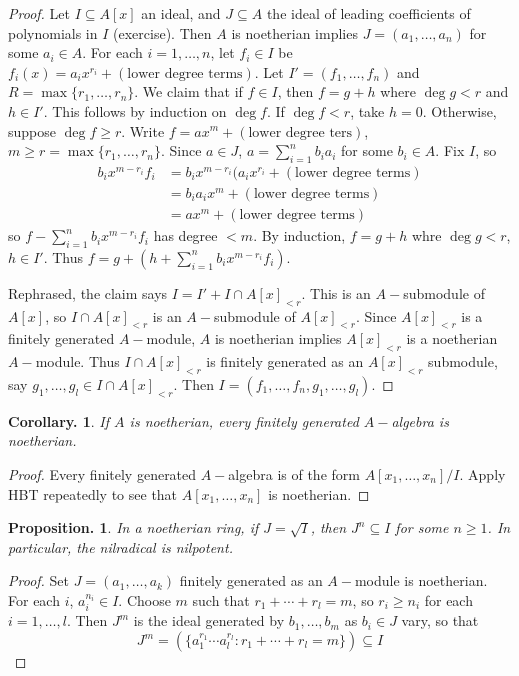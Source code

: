 \documentclass[11pt, a4paper]{memoir}
\theoremstyle{change}
\newtheorem{corollary}[theorem]{Corollary.}
\newtheorem{proposition}[theorem]{Proposition.}
\theoremstyle{plain}
\theoremstyle{nonumberplain}
\newtheorem{proof}{Proof}
\numberwithin{equation}{section}
\begin{document}
\begin{proof}
    Let $I\subseteq A[x]$ an ideal, and $J\subseteq A$ the ideal of leading coefficients of polynomials in $I$ (exercise).
    Then $A$ is noetherian implies $J=(a_1,\ldots,a_n)$ for some $a_i\in A$.
    For each $i=1,\ldots,n$, let $f_i\in I$ be $f_i(x)=a_ix^{r_i}+(\text{lower degree terms})$.
    Let $I'=(f_1,\ldots,f_n)$ and $R=\max\{r_1,\ldots,r_n\}$.
    We claim that if $f\in I$, then $f=g+h$ where $\deg g<r$ and $h\in I'$.
    This follows by induction on $\deg f$.
    If $\deg f<r$, take $h=0$.
    Otherwise, suppose $\deg f\geq r$.
    Write $f=ax^m+(\text{lower degree ters})$, $m\geq r=\max\{r_1,\ldots,r_n\}$.
    Since $a\in J$, $a=\sum_{i=1}^n b_ia_i$ for some $b_i\in A$.
    Fix $I$, so
    \begin{align*}
        b_ix^{m-r_i}f_i &= b_ix^{m-r_i}(a_ix^{r_i}+(\text{lower degree terms})\\
                        &= b_ia_ix^m+(\text{lower degree terms})\\
                        &= ax^m+(\text{lower degree terms})
    \end{align*}
    so $f-\sum_{i=1}^n b_ix^{m-r_i}f_i$ has degree $<m$.
    By induction, $f=g+h$ whre $\deg g<r$, $h\in I'$.
    Thus $f=g+(h+\sum_{i=1}^n b_ix^{m-r_i}f_i)$.

    Rephrased, the claim says $I=I'+I\cap A[x]_{<r}$.
    This is an $A-$submodule of $A[x]$, so $I\cap A[x]_{<r}$ is an $A-$submodule of $A[x]_{<r}$.
    Since $A[x]_{<r}$ is a finitely generated $A-$module, $A$ is noetherian implies $A[x]_{<r}$ is a noetherian $A-$module.
    Thus $I\cap A[x]_{<r}$ is finitely generated as an $A[x]_{<r}$ submodule, say $g_1,\ldots,g_l\in I\cap A[x]_{<r}$.
    Then $I=(f_1,\ldots,f_n,g_1,\ldots,g_l)$.
\end{proof}
\begin{corollary}
    If $A$ is noetherian, every finitely generated $A-$algebra is noetherian.
\end{corollary}
\begin{proof}
    Every finitely generated $A-$algebra is of the form $A[x_1,\ldots,x_n]/I$.
    Apply HBT repeatedly to see that $A[x_1,\ldots,x_n]$ is noetherian.
\end{proof}
\begin{proposition}
    In a noetherian ring, if $J=\sqrt{I}$, then $J^n\subseteq I$ for some $n\geq 1$.
    In particular, the nilradical is nilpotent.
\end{proposition}
\begin{proof}
    Set $J=(a_1,\ldots,a_k)$ finitely generated as an $A-$module is noetherian.
    For each $i$, $a_i^{n_i}\in I$.
    Choose $m$ such that $r_1+\cdots+r_l=m$, so $r_i\geq n_i$ for each $i=1,\ldots,l$.
    Then $J^m$ is the ideal generated by $b_1,\ldots,b_m$ as $b_i\in J$ vary, so that
    \begin{equation*}
        J^m=\left(\{a_1^{r_1}\cdots a_l^{r_l}:r_1+\cdots+r_l=m\}\right)\subseteq I
    \end{equation*}
\end{proof}
\end{document}
